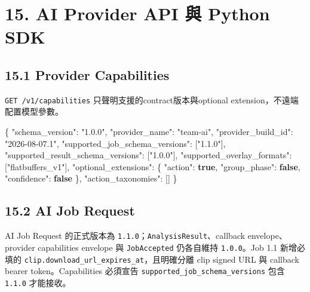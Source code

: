 \documentclass[
  9pt,
  a4paper,
]{article}
\newenvironment{Shaded}{}{}
\newcommand{\DataTypeTok}[1]{\textcolor[rgb]{0.56,0.13,0.00}{#1}}
\newcommand{\FunctionTok}[1]{\textcolor[rgb]{0.02,0.16,0.49}{#1}}
\newcommand{\KeywordTok}[1]{\textcolor[rgb]{0.00,0.44,0.13}{\textbf{#1}}}
\newcommand{\OtherTok}[1]{\textcolor[rgb]{0.00,0.44,0.13}{#1}}
\newcommand{\StringTok}[1]{\textcolor[rgb]{0.25,0.44,0.63}{#1}}
\begin{document}
\section{15. AI Provider API 與 Python
SDK}\label{15-ai-provider-api-ux8207-python-sdk}

\subsection{15.1 Provider Capabilities}\label{151-provider-capabilities}

\texttt{GET\ /v1/capabilities} 只聲明支援的contract版本與optional
extension，不遠端配置模型參數。

\begin{Shaded}
\begin{Highlighting}[]
\FunctionTok{\{}
  \DataTypeTok{"schema\_\allowbreak{}version"}\FunctionTok{:} \StringTok{"1.0.0"}\FunctionTok{,}
  \DataTypeTok{"provider\_\allowbreak{}name"}\FunctionTok{:} \StringTok{"team{-}ai"}\FunctionTok{,}
  \DataTypeTok{"provider\_\allowbreak{}build\_\allowbreak{}id"}\FunctionTok{:} \StringTok{"2026{-}08{-}07.1"}\FunctionTok{,}
  \DataTypeTok{"supported\_\allowbreak{}job\_\allowbreak{}schema\_\allowbreak{}versions"}\FunctionTok{:} \OtherTok{[}\StringTok{"1.1.0"}\OtherTok{]}\FunctionTok{,}
  \DataTypeTok{"supported\_\allowbreak{}result\_\allowbreak{}schema\_\allowbreak{}versions"}\FunctionTok{:} \OtherTok{[}\StringTok{"1.0.0"}\OtherTok{]}\FunctionTok{,}
  \DataTypeTok{"supported\_\allowbreak{}overlay\_\allowbreak{}formats"}\FunctionTok{:} \OtherTok{[}\StringTok{"flatbuffers\_\allowbreak{}v1"}\OtherTok{]}\FunctionTok{,}
  \DataTypeTok{"optional\_\allowbreak{}extensions"}\FunctionTok{:} \FunctionTok{\{}
    \DataTypeTok{"action"}\FunctionTok{:} \KeywordTok{true}\FunctionTok{,}
    \DataTypeTok{"group\_\allowbreak{}phase"}\FunctionTok{:} \KeywordTok{false}\FunctionTok{,}
    \DataTypeTok{"confidence"}\FunctionTok{:} \KeywordTok{false}
  \FunctionTok{\},}
  \DataTypeTok{"action\_\allowbreak{}taxonomies"}\FunctionTok{:} \OtherTok{[]}
\FunctionTok{\}}
\end{Highlighting}
\end{Shaded}

\subsection{15.2 AI Job Request}\label{152-ai-job-request}

AI Job Request 的正式版本為
\texttt{1.1.0}；\texttt{AnalysisResult}、callback envelope、provider
capabilities envelope 與 \texttt{JobAccepted} 仍各自維持
\texttt{1.0.0}。Job 1.1 新增必填的
\texttt{clip.download\_\allowbreak{}url\_\allowbreak{}expires\_\allowbreak{}at}，且明確分離 clip signed URL 與
callback bearer token。Capabilities 必須宣告
\texttt{supported\_\allowbreak{}job\_\allowbreak{}schema\_\allowbreak{}versions} 包含 \texttt{1.1.0} 才能接收。
\end{document}

